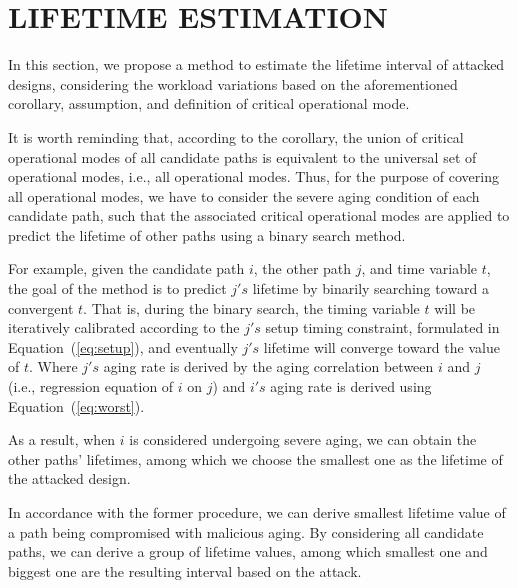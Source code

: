 
\section{LIFETIME ESTIMATION}
\label{sec:lt_estimation}
In this section, we propose a method to estimate the lifetime interval of attacked designs, considering the workload variations based on the aforementioned corollary, assumption, and definition of critical operational mode.

It is worth reminding that, according to the corollary, the union of critical operational modes of all candidate paths is equivalent to the universal set of operational modes, i.e., all operational modes. Thus, for the purpose of covering all operational modes, we have to consider the severe aging condition of each candidate path, such that the associated critical operational modes are applied to predict the lifetime of other paths using a binary search method.

For example, given the candidate path $i$, the other path $j$, and time variable $t$, the goal of the method is to predict $j's$ lifetime by binarily searching toward a convergent $t$. That is, during the binary search, the timing variable $t$ will be iteratively calibrated according to the $j's$ setup timing constraint, formulated in Equation~(\ref{eq:setup}), and eventually $j's$ lifetime will converge toward the value of $t$. Where $j's$ aging rate is derived by the aging correlation between $i$ and $j$ (i.e., regression equation of $i$ on $j$) and $i's$ aging rate is derived using Equation~(\ref{eq:worst}). 

As a result, when $i$ is considered undergoing severe aging, we can obtain the other paths' lifetimes, among which we choose the smallest one as the lifetime of the attacked design.

In accordance with the former procedure, we can derive smallest lifetime value of a path being compromised with malicious aging. By considering all candidate paths, we can derive a group of lifetime values, among which smallest one and biggest one are the resulting interval based on the attack.


  
